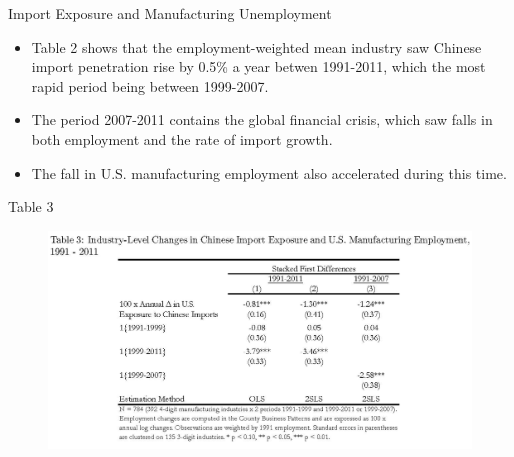 \documentclass[aspectratio=169]{beamer}
\begin{document}

\begin{frame}{Import Exposure and Manufacturing Unemployment}

\begin{itemize}
    \item<1-> Table 2 shows that the employment-weighted mean industry saw Chinese import penetration rise by 0.5\% a year betwen 1991-2011, which the most rapid period being between 1999-2007.
    \item<2-> The period 2007-2011 contains the global financial crisis, which saw falls in both employment and the rate of import growth.
    \item<3-> The fall in U.S. manufacturing employment also accelerated during this time.
\end{itemize}
    
\end{frame}


\begin{frame}{Table 3}

\begin{figure}
    \centering
    \includegraphics[scale=0.8]{AutorDornHansonTable3.jpg}
    \label{fig:Table3}
\end{figure}
    
\end{frame}

\end{document}
